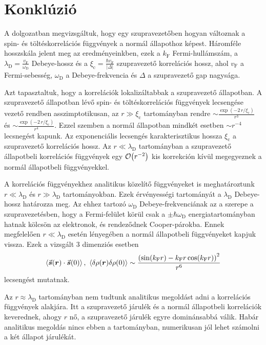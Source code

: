 \documentclass[a4paper,12pt,titlepage]{article}
\newcommand{\RR}{{\vb*{r}}}
\newcommand{\kF}{{k_\text{F}}}
\newcommand{\vF}{{v_\text{F}}}
\newcommand{\xic}{{\xi_\text{c}}}
\begin{document}
\section{Konklúzió}

A dolgozatban megvizsgáltuk, hogy egy szupravezetőben hogyan változnak a spin- és töltéskorrelációs függvények a normál állapothoz képest.  Háromféle hosszskála jelent meg az eredményeinkben, ezek a $\kF$ Fermi-hullámszám, a $\lambda_\text{D} = \frac{\vF}{\omega_\text{D}}$ Debeye-hossz és a $\xic = \frac{\hbar \vF}{\left| \Delta \right|}$ szupravezető korrelációs hossz, ahol $\vF$ a Fermi-sebesség, $\omega_\text{D}$ a Debeye-frekvencia és $\Delta$ a szupravezető gap nagysága.

Azt tapasztaltuk, hogy a korrelációk lokalizáltabbak a szupravezető állapotban.  A szupravezető állapotban lévő spin- és töltéskorrelációs függvények lecsengése vezető rendben asszimptotikusan, az $r \gg \xic$ tartományban rendre $\sim \frac{\exp(-2 \, r / \xic)}{r^3}$ és $\sim \frac{\exp(-2 \, r / \xic)}{r^4}$.  Ezzel szemben a normál állapotban mindkét esetben $\sim r^{-4}$ lecsnegést kapunk.  Az exponenciális lecsengés karakterisztikus hossza $\xic$ a szupravezető korrelációs hossz.  Az $r \ll \lambda_\text{D}$ tartományban a szupravezető állapotbeli korrelációs függvények egy $\order{r^{-2}}$ kis korrekción kívül megegyeznek a normál állapotbeli függvényekkel.

A korrelációs függvényekhez analitikus közelítő függvényeket is meghatároztunk $r \ll \lambda_\text{D}$ és $r \gg \lambda_\text{D}$ tartományokban.  Ezek érvényességi tartományát a $\lambda_\text{D}$ Debeye-hossz határozza meg.  Az ehhez tartozó $\omega_\text{D}$ Debeye-frekvenciának az a szerepe a szupravezetésben, hogy a Fermi-felület körül csak a $\pm \hbar \omega_\text{D}$ energiatartományban hatnak kölcsön az elektronok, és rendeződnek Cooper-párokba.  Ennek megfelelően $r \ll \lambda_\text{D}$ esetén lényegében a normál állapotbeli függvényeket kapjuk vissza.  Ezek a vizsgált 3 dimenziós esetben
$$ \expval{\va*{s}(\RR) \cdot \va*{s}(0)}, \ \expval{\delta\rho(\RR) \delta\rho(0)} \sim \frac{\left( \sin(\kF r) - \kF r \cos(\kF r) \right)^2}{r^6} $$
lecsengést mutatnak.

Az $r \approx \lambda_\text{D}$ tartományban nem tudtunk analitikus megoldást adni a korrelációs függvények alakjára.  Itt a szupravezető járulék és a normál állapotbeli korrelációk keverednek, ahogy $r$ nő, a szupravezető járulék egyre dominánsabbá válik.  Habár analitikus megoldás nincs ebben a tartományban, numerikusan jól lehet számolni a két állapot járulékát.
\end{document}

